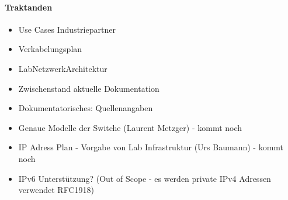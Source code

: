 \paragraph{Traktanden}
\begin{itemize}	
	\item Use Cases Industriepartner
	\item Verkabelungsplan
	\item LabNetzwerkArchitektur
	\item Zwischenstand aktuelle Dokumentation
	\item Dokumentatorisches: Quellenangaben
	\item Genaue Modelle der Switche (Laurent Metzger) - kommt noch
	\item IP Adress Plan - Vorgabe von Lab Infrastruktur (Urs Baumann) - kommt noch
	\item IPv6 Unterstützung? (Out of Scope - es werden private IPv4 Adressen verwendet RFC1918)
\end{itemize}

